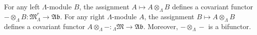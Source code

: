 For any left $\Lambda$-module $B$, the assignment $A \mapsto A \otimes_\Lambda B$ defines a covariant functor $- \otimes_\Lambda B : \mathfrak{M}_\Lambda^r \to \mathfrak{Ab}$. For any right $\Lambda$-module $A$, the assignment $B \mapsto A \otimes_\Lambda B$ defines a covariant functor $A \otimes_\Lambda - : {}_\Lambda\mathfrak{M} \to \mathfrak{Ab}$. Moreover, $- \otimes_\Lambda -$ is a bifunctor.
